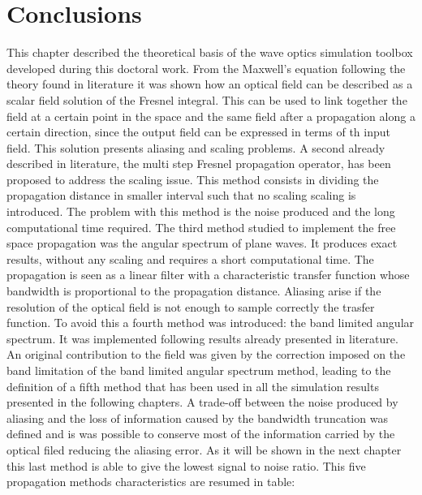\section{Conclusions}
This chapter described the theoretical basis of the wave optics simulation toolbox developed during this doctoral work.
From the Maxwell's equation following the theory found in literature it was shown how an optical field can be described as a scalar field solution of the Fresnel integral. This can be used to link together the field at a certain point in the space and the same field after a propagation along a certain direction, since the output field can be expressed in terms of th input field. This solution presents aliasing and scaling problems. A second already described in literature, the multi step Fresnel propagation operator, has been proposed to address the scaling issue. This method consists in dividing the propagation distance in smaller interval such that no scaling scaling is introduced. The problem with this method is the noise produced and the long computational time required. 
The third method studied to implement the free space propagation was the angular spectrum of plane waves. It produces exact results, without any scaling and requires a short computational time. The propagation is seen as a linear filter with a characteristic transfer function whose bandwidth is proportional to the propagation distance. Aliasing arise if the resolution of the optical field is not enough to sample correctly the trasfer function. To avoid this a fourth method was introduced: the band limited angular spectrum. It was implemented following results already presented in literature. An original contribution to the field was given by the correction imposed on the band limitation of the band limited angular spectrum method, leading to the definition of a fifth method that has been used in all the simulation results presented in the following chapters. A trade-off between the noise produced by aliasing and the loss of information caused by the bandwidth truncation was defined and is was possible to conserve most of the information carried by the optical filed reducing the aliasing error. As it will be shown in the next chapter this last method is able to give the lowest signal to noise ratio.
This five propagation methods characteristics are resumed in table:
